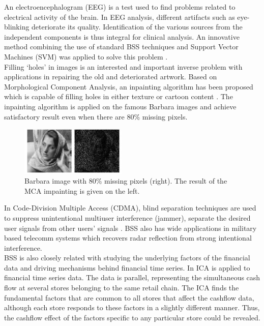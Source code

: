 An electroencephalogram (EEG) is a test used to find problems related to electrical activity of the brain. In EEG analysis, different artifacts such as eye-blinking deteriorate its quality. Identification of the various sources from the independent components is thus integral for clinical analysis. An innovative method combining the use of standard BSS techniques and Support Vector Machines (SVM) was applied to solve this problem  \cite{Duda2000PC954544}.\\

Filling `holes' in images is an interested and important inverse problem with applications in repairing the old and deteriorated artwork. Based on Morphological Component Analysis, an inpainting algorithm has been proposed  which is capable of filling holes in either texture or cartoon content \cite{ELAD2005340}. The inpainting algorithm is applied on the famous Barbara images and achieve satisfactory result even when there are 80\% missing pixels. \\

\begin{figure}[!htbp]
\centering
\includegraphics[width=0.45\textwidth]{images/impainting1.png}
\caption{Barbara image with $80\%$ missing pixels (right). The result of the MCA impainting is
given on the left.}
\label{imapint1}
\end{figure}

In Code-Division Multiple Access (CDMA), blind separation techniques are used to suppress unintentional multiuser interference (jammer), separate the desired user signals from other users' signals \cite{Raju2006}. BSS also has wide applications in military based telecomm systems which recovers radar reflection from strong intentional interference.\\

BSS is also closely related with studying the underlying factors of the financial data and driving mechanisms behind financial time series. In \cite{OjaE2000Icaf} ICA is applied to financial time series data. The data is parallel, representing the simultaneous cash flow at several stores belonging to the same retail chain. The ICA finds the fundamental factors that are common to all stores that affect the cashflow data, although each store responds to these factors in a slightly different manner. Thus, the cashflow effect of the factors specific to any particular store could be revealed.

